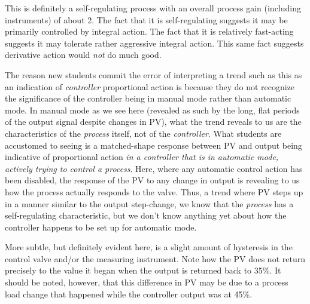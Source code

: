 





This is definitely a self-regulating process with an overall process gain (including instruments) of about 2.  The fact that it is self-regulating suggests it may be primarily controlled by integral action.  The fact that it is relatively fast-acting suggests it may tolerate rather aggressive integral action.  This same fact suggests derivative action would {\it not} do much good.

\vskip 10pt

The reason new students commit the error of interpreting a trend such as this as an indication of {\it controller} proportional action is because they do not recognize the significance of the controller being in manual mode rather than automatic mode.  In manual mode as we see here (revealed as such by the long, flat periods of the output signal despite changes in PV), what the trend reveals to us are the characteristics of the {\it process} itself, not of the {\it controller}.  What students are accustomed to seeing is a matched-shape response between PV and output being indicative of proportional action {\it in a controller that is in automatic mode, actively trying to control a process}.  Here, where any automatic control action has been disabled, the response of the PV to any change in output is revealing to us how the process actually responds to the valve.  Thus, a trend where PV steps up in a manner similar to the output step-change, we know that the {\it process} has a self-regulating characteristic, but we don't know anything yet about how the controller happens to be set up for automatic mode.







More subtle, but definitely evident here, is a slight amount of hysteresis in the control valve and/or the measuring instrument.  Note how the PV does not return precisely to the value it began when the output is returned back to 35\%.  It should be noted, however, that this difference in PV may be due to a process load change that happened while the controller output was at 45\%.





